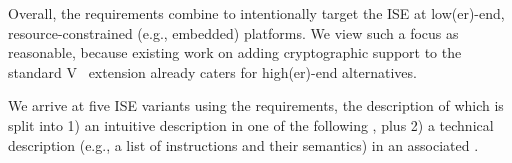 \noindent
Overall, the requirements combine to intentionally target the ISE at 
 low(er)-end,
resource-constrained (e.g., embedded) platforms.  
We view such a focus as reasonable, because existing work on adding
cryptographic support to the
standard 
V~\cite[Section 21]{RV:ISA:I:19}
extension
already caters for
high(er)-end
alternatives.

We arrive at five ISE variants using the requirements, the description of 
which is split into
1) an 
   intuitive 
   description in one of the following \SEC[s],
   plus
2) a
   technical
   description
   (e.g., a list of instructions and their semantics)
   in an associated \APPX.

